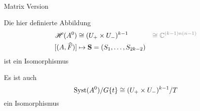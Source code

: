 \begin{frame}{Matrix Version}
  \begin{tthm}
    Die hier definierte Abbildung
    \begin{align*}
      \sH(A^0)&\cong(U_+\times U_-)^{k-1}
      &\textcolor{gray}{\cong\C^{(k-1)n(n-1)}}
    \\ [(A,\hat F)]&\mapsto\textbf{S}=(S_1,\dots,S_{2k-2})
    \end{align*}
    ist ein Isomorphismus
    \begin{cor}
      Es ist auch 
      \[
        \operatorname{Syst}(A^0)/G\{t\}\cong(U_+\times U_-)^{k-1}/T
      \]
      ein Isomorphismus
    \end{cor}
  \end{tthm}
\end{frame}

